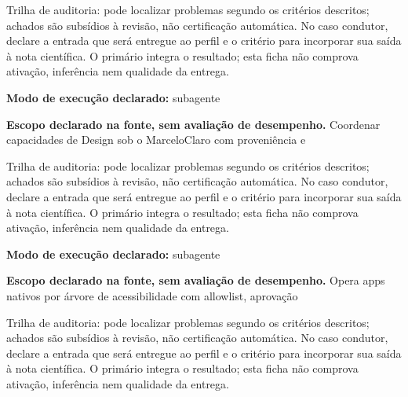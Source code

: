 \begin{funcao}
Trilha de auditoria: pode localizar problemas segundo os critérios descritos; achados são subsídios à revisão, não certificação automática. No caso condutor, declare a entrada que será entregue ao perfil e o critério para incorporar sua saída à nota científica. O primário integra o resultado; esta ficha não comprova ativação, inferência nem qualidade da entrega.
\end{funcao}

\begin{arquitetura}
\textbf{Modo de execução declarado:} subagente
\end{arquitetura}


\begin{descricao}
\textbf{Escopo declarado na fonte, sem avaliação de desempenho.}
Coordenar capacidades de Design sob o MarceloClaro com proveniência e
\end{descricao}

\begin{funcao}
Trilha de auditoria: pode localizar problemas segundo os critérios descritos; achados são subsídios à revisão, não certificação automática. No caso condutor, declare a entrada que será entregue ao perfil e o critério para incorporar sua saída à nota científica. O primário integra o resultado; esta ficha não comprova ativação, inferência nem qualidade da entrega.
\end{funcao}

\begin{arquitetura}
\textbf{Modo de execução declarado:} subagente
\end{arquitetura}


\begin{descricao}
\textbf{Escopo declarado na fonte, sem avaliação de desempenho.}
Opera apps nativos por árvore de acessibilidade com allowlist, aprovação
\end{descricao}

\begin{funcao}
Trilha de auditoria: pode localizar problemas segundo os critérios descritos; achados são subsídios à revisão, não certificação automática. No caso condutor, declare a entrada que será entregue ao perfil e o critério para incorporar sua saída à nota científica. O primário integra o resultado; esta ficha não comprova ativação, inferência nem qualidade da entrega.
\end{funcao}

